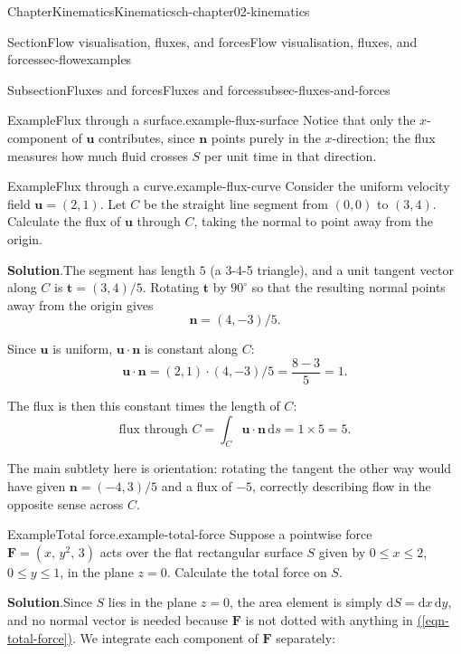 \documentclass[oneside,10pt,]{book}
\newcommand{\blocktitlefont}{\relax}
\newcommand{\xreffont}{\relax}
\numberwithin{equation}{section}
\newcommand{\de}{\mathrm{d}}
\newcommand{\bn}{\boldsymbol{n}}
\newcommand{\bt}{\boldsymbol{t}}
\newcommand{\bu}{\boldsymbol{u}}
\newcommand{\bF}{\boldsymbol{F}}
\renewcommand{\bt}{\boldsymbol{t}}
\begin{document}
\begin{chapterptx}{Chapter}{Kinematics}{}{Kinematics}{}{}{ch-chapter02-kinematics}
\begin{sectionptx}{Section}{Flow visualisation, fluxes, and forces}{}{Flow visualisation, fluxes, and forces}{}{}{sec-flowexamples}
\begin{subsectionptx}{Subsection}{Fluxes and forces}{}{Fluxes and forces}{}{}{subsec-fluxes-and-forces}
\begin{example}{Example}{Flux through a surface.}{example-flux-surface}
Notice that only the \(x\)-component of \(\bu\) contributes, since \(\bn\) points purely in the \(x\)-direction; the flux measures how much fluid crosses \(S\) per unit time in that direction.%
\end{example}
\begin{example}{Example}{Flux through a curve.}{example-flux-curve}%
Consider the uniform velocity field \(\bu = (2,1)\). Let \(C\) be the straight line segment from \((0,0)\) to \((3,4)\). Calculate the flux of \(\bu\) through \(C\), taking the normal to point away from the origin.%
\par\smallskip%
\noindent\textbf{\blocktitlefont Solution}.\hypertarget{example-flux-curve-3}{}\quad{}The segment has length \(5\) (a 3-4-5 triangle), and a unit tangent vector along \(C\) is \(\bt = (3,4)/5\). Rotating \(\bt\) by \(90^\circ\) so that the resulting normal points away from the origin gives%
\begin{equation*}
\bn = (4,-3)/5.
\end{equation*}
%
\par
Since \(\bu\) is uniform, \(\bu\cdot\bn\) is constant along \(C\):%
\begin{equation*}
\bu\cdot\bn = (2,1)\cdot(4,-3)/5 = \frac{8-3}{5} = 1.
\end{equation*}
%
\par
The flux is then this constant times the length of \(C\):%
\begin{equation*}
\text{flux through $C$} = \int_C \bu\cdot\bn\,\de{s} = 1 \times 5 = 5.
\end{equation*}
%
\par
The main subtlety here is orientation: rotating the tangent the other way would have given \(\bn=(-4,3)/5\) and a flux of \(-5\), correctly describing flow in the opposite sense across \(C\).%
\end{example}
\begin{example}{Example}{Total force.}{example-total-force}%
Suppose a pointwise force \(\bF = (x,\, y^2,\, 3)\) acts over the flat rectangular surface \(S\) given by \(0\le x\le 2\), \(0\le y\le 1\), in the plane \(z=0\). Calculate the total force on \(S\).%
\par\smallskip%
\noindent\textbf{\blocktitlefont Solution}.\hypertarget{example-total-force-3}{}\quad{}Since \(S\) lies in the plane \(z=0\), the area element is simply \(\de{S}=\de{x}\,\de{y}\), and no normal vector is needed because \(\bF\) is not dotted with anything in \hyperref[eqn-total-force]{({\xreffont\ref{eqn-total-force}})}. We integrate each component of \(\bF\) separately:%

\end{example}
\end{subsectionptx}
\end{sectionptx}
\end{chapterptx}
\end{document}
